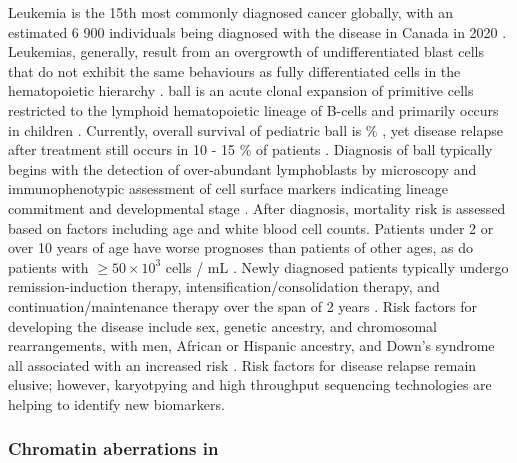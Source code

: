 Leukemia is the 15th most commonly diagnosed cancer globally, with an estimated 6 900 individuals being diagnosed with the disease in Canada in 2020 \cite{brayGlobalCancerStatistics2018,brennerProjectedEstimatesCancer2020}.
Leukemias, generally, result from an overgrowth of undifferentiated blast cells that do not exhibit the same behaviours as fully differentiated cells in the hematopoietic hierarchy \cite{quigleyGenomicHallmarksStructural2018}.
\Gls{ball} is an acute clonal expansion of primitive cells restricted to the lymphoid hematopoietic lineage of B-cells and primarily occurs in children \cite{hungerAcuteLymphoblasticLeukemia2015}.
Currently, overall survival of pediatric \gls{ball} is  \% \cite{hungerAcuteLymphoblasticLeukemia2015}, yet disease relapse after treatment still occurs in 10 - 15 \% of patients \cite{inabaAcuteLymphoblasticLeukaemia2013,heikampNextGenerationEvaluationTreatment2018}.
Diagnosis of \gls{ball} typically begins with the detection of over-abundant lymphoblasts by microscopy and immunophenotypic assessment of cell surface markers indicating lineage commitment and developmental stage \cite{inabaAcuteLymphoblasticLeukaemia2013}.
After diagnosis, mortality risk is assessed based on factors including age and white blood cell counts.
Patients under 2 or over 10 years of age have worse prognoses than patients of other ages, as do patients with $\ge 50 \times 10^3$ cells / mL \cite{hungerAcuteLymphoblasticLeukemia2015,inabaAcuteLymphoblasticLeukaemia2013}.
Newly diagnosed patients typically undergo remission-induction therapy, intensification/consolidation therapy, and continuation/maintenance therapy over the span of 2 years \cite{inabaAcuteLymphoblasticLeukaemia2013}.
Risk factors for developing the disease include sex, genetic ancestry, and chromosomal rearrangements, with men, African or Hispanic ancestry, and Down's syndrome all associated with an increased risk \cite{inabaAcuteLymphoblasticLeukaemia2013,hungerAcuteLymphoblasticLeukemia2015}.
Risk factors for disease relapse remain elusive; however, karyotpying and high throughput sequencing technologies are helping to identify new biomarkers.

\subsubsection{Chromatin aberrations in }

